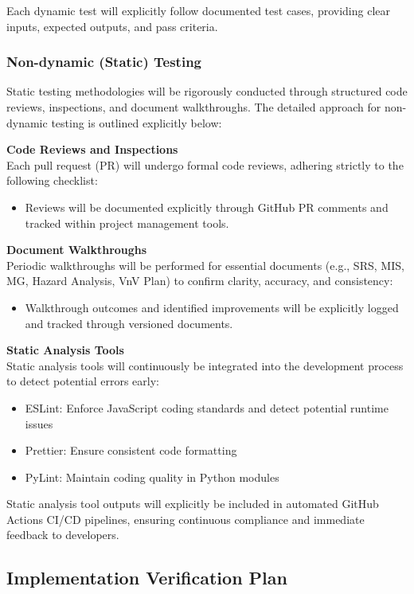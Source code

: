 \documentclass[12pt, titlepage]{article}
\begin{document}
Each dynamic test will explicitly follow documented test cases, providing clear inputs, expected outputs, and pass criteria.

\subsubsection*{Non-dynamic (Static) Testing}
Static testing methodologies will be rigorously conducted through structured code reviews, inspections, and document walkthroughs. The detailed approach for non-dynamic testing is outlined explicitly below:

\textbf{Code Reviews and Inspections} \\
Each pull request (PR) will undergo formal code reviews, adhering strictly to the following checklist:
\begin{itemize}
    \item Reviews will be documented explicitly through GitHub PR comments and tracked within project management tools.
\end{itemize}

\textbf{Document Walkthroughs} \\
Periodic walkthroughs will be performed for essential documents (e.g., SRS, MIS, MG, Hazard Analysis, VnV Plan) to confirm clarity, accuracy, and consistency:
\begin{itemize}
    \item Walkthrough outcomes and identified improvements will be explicitly logged and tracked through versioned documents.
\end{itemize}

\textbf{Static Analysis Tools} \\
Static analysis tools will continuously be integrated into the development process to detect potential errors early:
\begin{itemize}
    \item ESLint: Enforce JavaScript coding standards and detect potential runtime issues
    \item Prettier: Ensure consistent code formatting
    \item PyLint: Maintain coding quality in Python modules
\end{itemize}

Static analysis tool outputs will explicitly be included in automated GitHub Actions CI/CD pipelines, ensuring continuous compliance and immediate feedback to developers.

\subsection{Implementation Verification Plan}
\end{document}
